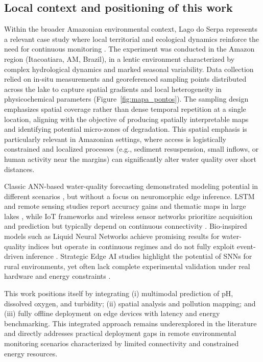 \subsection{Local context and positioning of this work}

Within the broader Amazonian environmental context, Lago do Serpa represents a relevant case study where local territorial and ecological dynamics reinforce the need for continuous monitoring \cite{nogueira2022}. The experiment was conducted in the Amazon region (Itacoatiara, AM, Brazil), in a lentic environment characterized by complex hydrological dynamics and marked seasonal variability. Data collection relied on in-situ measurements and georeferenced sampling points distributed across the lake to capture spatial gradients and local heterogeneity in physicochemical parameters (Figure~\ref{fig:mapa_pontos}). The sampling design emphasizes spatial coverage rather than dense temporal repetition at a single location, aligning with the objective of producing spatially interpretable maps and identifying potential micro-zones of degradation. This spatial emphasis is particularly relevant in Amazonian settings, where access is logistically constrained and localized processes (e.g., sediment resuspension, small inflows, or human activity near the margins) can significantly alter water quality over short distances.

Classic ANN-based water-quality forecasting demonstrated modeling potential in different scenarios \cite{palani2008}, but without a focus on neuromorphic edge inference. LSTM and remote sensing studies report accuracy gains and thematic maps in large lakes \cite{qi2020}, while IoT frameworks and wireless sensor networks prioritize acquisition and prediction but typically depend on continuous connectivity \cite{rahu2023,rosero2020}. Bio-inspired models such as Liquid Neural Networks achieve promising results for water-quality indices but operate in continuous regimes and do not fully exploit event-driven inference \cite{chadalavada2025}. Strategic Edge AI studies highlight the potential of SNNs for rural environments, yet often lack complete experimental validation under real hardware and energy constraints \cite{aral2024}.

This work positions itself by integrating (i) multimodal prediction of pH, dissolved oxygen, and turbidity; (ii) spatial analysis and pollution mapping; and (iii) fully offline deployment on edge devices with latency and energy benchmarking. This integrated approach remains underexplored in the literature and directly addresses practical deployment gaps in remote environmental monitoring scenarios characterized by limited connectivity and constrained energy resources.

